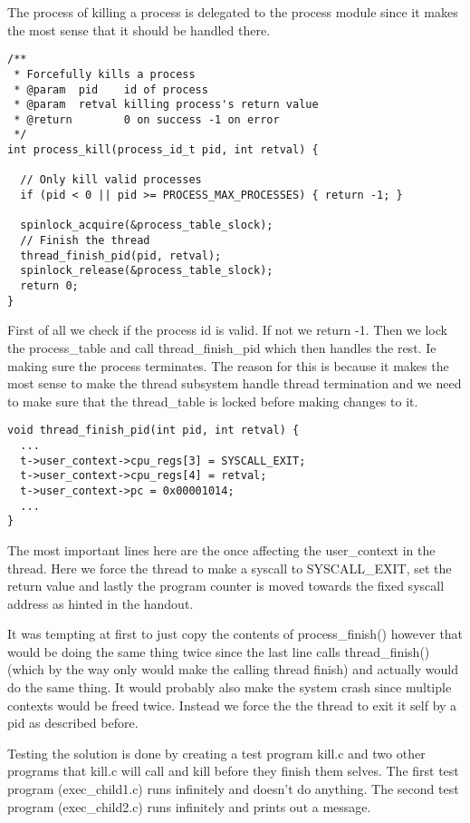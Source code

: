 \documentclass[12pt]{article}
\begin{document}
The process of killing a process is delegated to the process module since it makes the most sense that it should be handled there.

\begin{lstlisting}[caption=process.c]
/**
 * Forcefully kills a process
 * @param  pid    id of process
 * @param  retval killing process's return value
 * @return        0 on success -1 on error
 */
int process_kill(process_id_t pid, int retval) {

  // Only kill valid processes
  if (pid < 0 || pid >= PROCESS_MAX_PROCESSES) { return -1; }

  spinlock_acquire(&process_table_slock);
  // Finish the thread
  thread_finish_pid(pid, retval);
  spinlock_release(&process_table_slock);
  return 0;
}
\end{lstlisting}

First of all we check if the process id is valid. If not we return -1. Then we lock the process\_table and call thread\_finish\_pid which then handles the rest. Ie making sure the process terminates. The reason for this is because it makes the most sense to make the thread subsystem handle thread termination and we need to make sure that the thread\_table is locked before making changes to it. 

\begin{lstlisting}[caption=thread.c]
void thread_finish_pid(int pid, int retval) {
  ...
  t->user_context->cpu_regs[3] = SYSCALL_EXIT;
  t->user_context->cpu_regs[4] = retval;
  t->user_context->pc = 0x00001014;
  ...
}
\end{lstlisting}

The most important lines here are the once affecting the user\_context in the thread. Here we force the thread to make a syscall to SYSCALL\_EXIT, set the return value and lastly the program counter is moved towards the fixed syscall address as hinted in the handout. 

It was tempting at first to just copy the contents of  process\_finish() however that would be doing the same thing twice since the last line calls thread\_finish() (which by the way only would make the calling thread finish) and actually would do the same thing. It would probably also make the system crash since multiple contexts would be freed twice. Instead we force the the thread to exit it self by a pid as described before.

Testing the solution is done by creating a test program kill.c and two other programs that kill.c will call and kill before they finish them selves. The first test program (exec\_child1.c) runs infinitely and doesn't do anything. The second test program (exec\_child2.c) runs infinitely and prints out a message.
\end{document}
